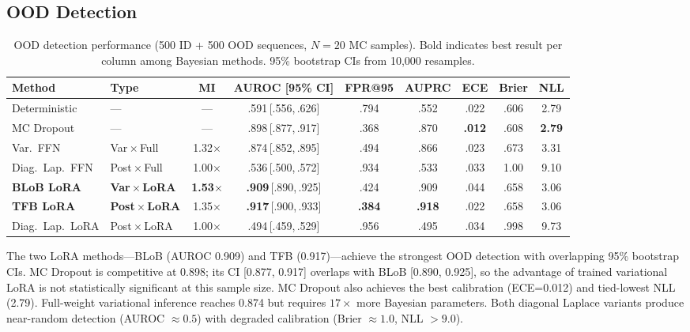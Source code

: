 \documentclass{article}
\newcommand{\ra}[1]{\renewcommand{\arraystretch}{#1}}
\begin{document}
\subsection{OOD Detection}

\begin{table}[t]
\caption{OOD detection performance (500 ID + 500 OOD sequences, $N{=}20$ MC samples). Bold indicates best result per column among Bayesian methods. 95\% bootstrap CIs from 10{,}000 resamples.}
\label{tab:ood}
\centering
\footnotesize
\ra{1.15}
\setlength{\tabcolsep}{4pt}
\begin{tabular}{@{}llccccccc@{}}
\toprule
Method & Type & MI & AUROC [95\% CI] & FPR@95 & AUPRC & ECE & Brier & NLL \\
\midrule
Deterministic & --- & --- & .591\,[.556,\,.626] & .794 & .552 & .022 & .606 & 2.79 \\
MC Dropout & --- & --- & .898\,[.877,\,.917] & .368 & .870 & \textbf{.012} & .608 & \textbf{2.79} \\
\midrule
Var.\ FFN & Var\,$\times$\,Full & 1.32$\times$ & .874\,[.852,\,.895] & .494 & .866 & .023 & .673 & 3.31 \\
Diag.\ Lap.\ FFN & Post\,$\times$\,Full & 1.00$\times$ & .536\,[.500,\,.572] & .934 & .533 & .033 & 1.00 & 9.10 \\
\textbf{BLoB LoRA} & \textbf{Var\,$\times$\,LoRA} & \textbf{1.53$\times$} & \textbf{.909}\,[.890,\,.925] & .424 & .909 & .044 & .658 & 3.06 \\
\textbf{TFB LoRA} & \textbf{Post\,$\times$\,LoRA} & 1.35$\times$ & \textbf{.917}\,[.900,\,.933] & \textbf{.384} & \textbf{.918} & .022 & .658 & 3.06 \\
Diag.\ Lap.\ LoRA & Post\,$\times$\,LoRA & 1.00$\times$ & .494\,[.459,\,.529] & .956 & .495 & .034 & .998 & 9.73 \\
\bottomrule
\end{tabular}
\end{table}


The two LoRA methods---BLoB (AUROC 0.909) and TFB (0.917)---achieve the strongest OOD detection with overlapping 95\% bootstrap CIs. MC Dropout is competitive at 0.898; its CI [0.877, 0.917] overlaps with BLoB [0.890, 0.925], so the advantage of trained variational LoRA is not statistically significant at this sample size. MC Dropout also achieves the best calibration (ECE=0.012) and tied-lowest NLL (2.79). Full-weight variational inference reaches 0.874 but requires $17{\times}$ more Bayesian parameters. Both diagonal Laplace variants produce near-random detection (AUROC $\approx 0.5$) with degraded calibration (Brier $\approx 1.0$, NLL $> 9.0$).
\end{document}
